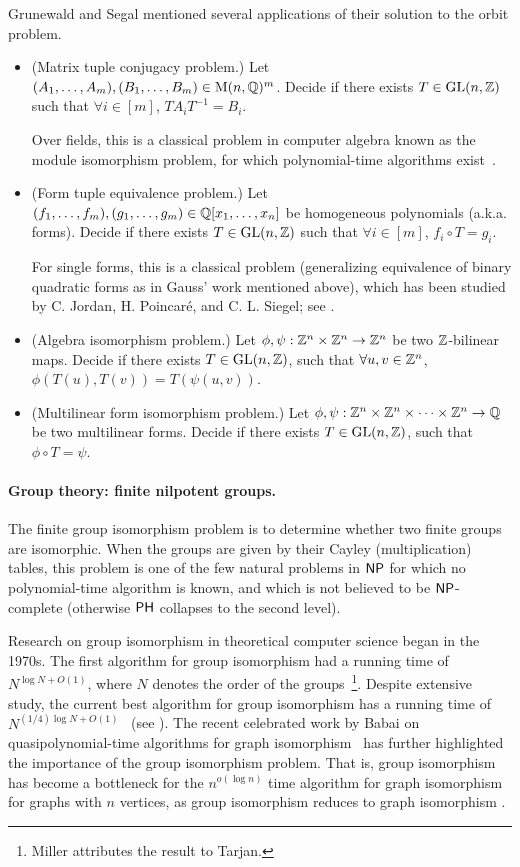 Grunewald and Segal mentioned several applications of their solution to the orbit problem. 
\begin{itemize}
	\item (Matrix tuple conjugacy problem.) Let $(A_1, \dots, A_m), (B_1, \dots, B_m)\in \mathrm{M}(n, \mathbb{Q})^m$. Decide if there exists $T\in\mathrm{GL}(n, \mathbb{Z})$ such that $\forall i\in[m]$, $TA_iT^{-1}=B_i$. 
	
	Over fields, this is a classical problem in computer algebra known as the module isomorphism problem, for which polynomial-time algorithms exist~\cite{CIK97,BL08}.
	
	\item (Form tuple equivalence problem.) Let $(f_1, \dots, f_m), (g_1, \dots, g_m)\in\mathbb{Q}[x_1, \dots, x_n]$ be homogeneous polynomials (a.k.a. forms). Decide if there exists $T\in \mathrm{GL}(n, \mathbb{Z})$ such that $\forall i\in[m]$, $f_i\circ T=g_i$. 
	
		For single forms, this is a classical problem (generalizing equivalence of binary quadratic forms as in Gauss' work mentioned above), which has been studied by C. Jordan, H. Poincar\'e, and C. L. Siegel; see \cite{GS-overview}.

	\item (Algebra isomorphism problem.) Let $\phi, \psi:\mathbb{Z}^n\times\mathbb{Z}^n\to\mathbb{Z}^n$ be two $\mathbb{Z}$-bilinear maps. Decide if there exists $T\in\mathrm{GL}(n, \mathbb{Z})$, such that $\forall u, v\in \mathbb{Z}^n$, $\phi(T(u), T(v))=T(\psi(u, v))$. 
	\item (Multilinear form isomorphism problem.) Let $\phi, \psi:\mathbb{Z}^n\times\mathbb{Z}^n\times\dots\times \mathbb{Z}^n\to \mathbb{Q}$ be two multilinear forms. Decide if there exists $T\in\mathrm{GL}(n, \mathbb{Z})$, such that $\phi\circ T=\psi$. 
\end{itemize}


\paragraph{Group theory: finite nilpotent groups.}
The finite group isomorphism problem is to determine whether two finite groups are isomorphic. When the groups are given by their Cayley (multiplication) tables, this problem is one of the few natural problems in $\mathsf{NP}$ for which no polynomial-time algorithm is known, and which is not believed to be $\mathsf{NP}$-complete (otherwise $\mathsf{PH}$ collapses to the second level).

Research on group isomorphism in theoretical computer science began in the 1970s. The first algorithm for group isomorphism had a running time of $N^{\log N + O(1)}$, where $N$ denotes the order of the groups~\cite{Mil78, FN}\footnote{Miller attributes the result to Tarjan.}. Despite extensive study, the current best algorithm for group isomorphism has a running time of $N^{(1/4) \log N + O(1)}$~\cite{Ros13} (see \cite[Sec.~2.2]{LeGallRosenbaum}).
The recent celebrated work by Babai on quasipolynomial-time algorithms for graph isomorphism~\cite{babai2016graph} has further highlighted the importance of the group isomorphism problem. That is, group isomorphism has become a bottleneck for the $n^{o(\log n)}$ time algorithm for graph isomorphism for graphs with $n$ vertices, as group isomorphism reduces to graph isomorphism \cite{KST93}.

